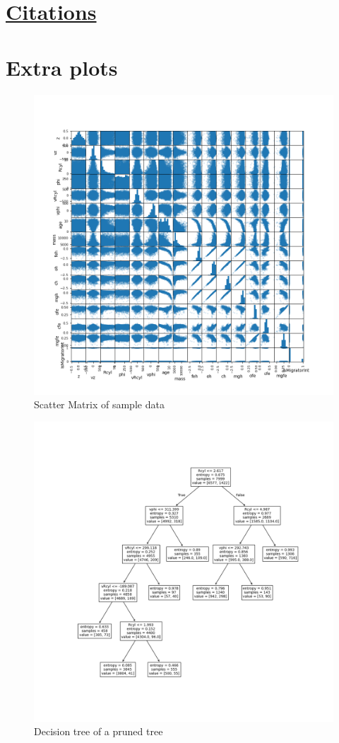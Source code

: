 \documentclass[%
 aapm,
 mph,%
 amsmath,amssymb,
 reprint,%
]{revtex4-2}
\begin{document}
\newpage

\nocite{*}
\section*{\underline{Citations}}


\appendix \section{Extra plots} %
 
\begin{figure}[h!]
    \centering
    \includegraphics[width=\columnwidth]{Plots/scatter_matrix.png}
    \caption{Scatter Matrix of sample data}
    \label{fig:scattermatrix}
\end{figure}


\begin{figure}[h!]
    \centering
    \includegraphics[width=\columnwidth]{Plots/DecisionTree.png}
    \caption{Decision tree of a pruned tree}
    \label{fig:DecisionTree}
\end{figure}
\end{document}
